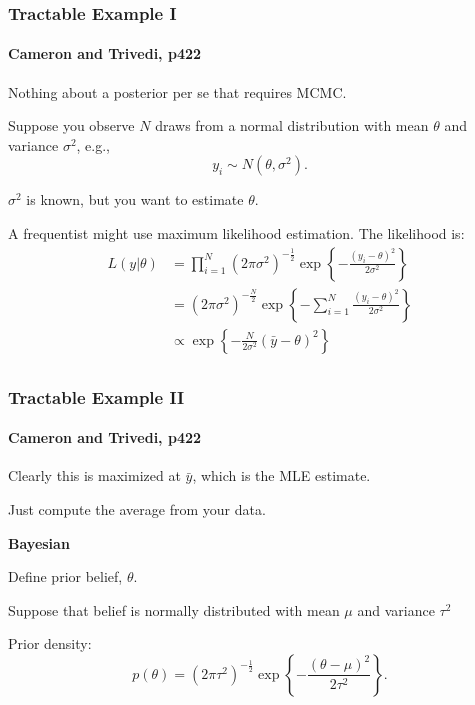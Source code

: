\documentclass[11pt, aspectratio=169]{beamer}
\newenvironment{wideitemize}{\itemize\addtolength{\itemsep}{10pt}}{\enditemize}
\begin{document}
\begin{frame}[t]\frametitle{Tractable Example I}
\framesubtitle{Cameron and Trivedi, p422}    

Nothing about a posterior per se that requires MCMC.


\begin{wideitemize}
	\item Suppose you observe $N$ draws from 
a normal distribution with mean $\theta$ and variance $\sigma^2$, e.g., 
$$y_i \sim N(\theta, \sigma^2).$$ 
	\item $\sigma^2$ is known, but you want to estimate $\theta$.
	\item A frequentist might use maximum likelihood estimation. The likelihood is:
\begin{align*}
L(y|\theta) &= \prod_{i=1}^N (2\pi \sigma^2)^{- \frac{1}{2} } \exp \left\{ - \frac{(y_i - \theta)^2}{2 \sigma^2} \right\} \\
&= (2\pi \sigma^2)^{- \frac{N}{2} } \exp  \left\{ - \sum_{i=1}^N \frac{(y_i - \theta)^2}{2 \sigma^2} \right\} \\
&  \propto  \exp  \left\{ - \frac{N}{2 \sigma^2}   (\bar{y} - \theta)^2 \right\} \\
\end{align*}
\end{wideitemize}


\end{frame}


\begin{frame}[t]\frametitle{Tractable Example II}
\framesubtitle{Cameron and Trivedi, p422}    

\begin{wideitemize}
	\item Clearly this is maximized at $\bar{y}$, which is the MLE estimate.
	\item Just compute the average from your data. 
\end{wideitemize}

\textbf{Bayesian}
\begin{wideitemize}
	\item Define prior belief, $\theta$.
	\item Suppose that belief is normally distributed with mean $\mu$ and variance $\tau^2$
	\item Prior density:
	$$p(\theta) =  (2\pi \tau^2)^{- \frac{1}{2} } \exp \left\{ - \frac{(\theta - \mu)^2}{2 \tau^2} \right\}.$$

\end{wideitemize}

\end{frame}
\end{document}
